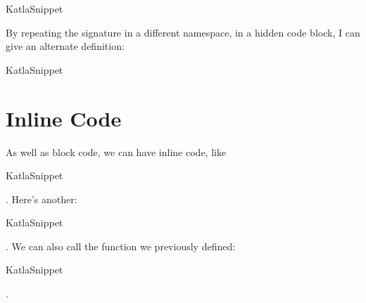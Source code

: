 \let\KatlaSnippet\relax{}\newcommand\KatlaSnippet[1][]{\BUseVerbatim[#1]{KatlaSnippet}}
\begin{SaveVerbatim}[commandchars=\\\{\}]{KatlaSnippet}
\KatlaSpace{}\KatlaSpace{}\IdrisKeyword{=}\KatlaSpace{}\KatlaSpace{}\IdrisFunction{++}\KatlaSpace{}\KatlaNewline{}
\end{SaveVerbatim}
\KatlaSnippet{}

By repeating the signature in a different namespace, in a hidden code
block, I can give an alternate definition:

\let\KatlaSnippet\relax{}\newcommand\KatlaSnippet[1][]{\BUseVerbatim[#1]{KatlaSnippet}}
\begin{SaveVerbatim}[commandchars=\\\{\}]{KatlaSnippet}
\KatlaSpace{}\KatlaSpace{}\IdrisKeyword{=}\KatlaSpace{}\KatlaSpace{}\IdrisFunction{++}\KatlaSpace{}\KatlaSpace{}\KatlaNewline{}
\end{SaveVerbatim}
\KatlaSnippet{}

\hypertarget{inline-code}{%
\section{Inline Code}\label{inline-code}}

As well as block code, we can have inline code, like
\let\KatlaSnippet\relax{}\newcommand\KatlaSnippet[1][]{\UseVerb[#1]{KatlaSnippet}}
\begin{SaveVerbatim}[commandchars=\\\{\}]{KatlaSnippet}
\KatlaSpace{}\KatlaSpace{}\KatlaNewline{}
\end{SaveVerbatim}
\KatlaSnippet{}. Here's another:
\let\KatlaSnippet\relax{}\newcommand\KatlaSnippet[1][]{\UseVerb[#1]{KatlaSnippet}}
\begin{SaveVerbatim}[commandchars=\\\{\}]{KatlaSnippet}
\KatlaSpace{}\IdrisFunction{+}\KatlaSpace{}\KatlaNewline{}
\end{SaveVerbatim}
\KatlaSnippet{}. We can also call the function we previously defined:
\let\KatlaSnippet\relax{}\newcommand\KatlaSnippet[1][]{\UseVerb[#1]{KatlaSnippet}}
\begin{SaveVerbatim}[commandchars=\\\{\}]{KatlaSnippet}
\KatlaSpace{}\IdrisData{[1,}\KatlaSpace{}\KatlaSpace{}\IdrisData{3]}\KatlaNewline{}
\end{SaveVerbatim}
\KatlaSnippet{}.

